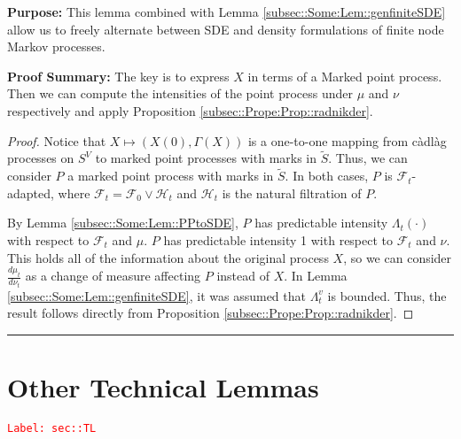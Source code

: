 \documentclass[12pt]{article}
\newcommand{\mc}{\mathcal}
\newcommand{\tr}{\textcolor{red}}
\newcommand{\labe}[1]{\tr{\texttt{Label: #1}}}
\newcommand{\purpose}{\textbf{Purpose: }}
\newcommand{\pfsum}{\textbf{Proof Summary: }}
\newcommand{\ind}{\hspace{24pt}}
\newcommand{\lin}{\rule{\linewidth}{0.4 pt}}
\renewcommand{\v}{v}							%
\renewcommand{\S}{S}							%
\renewcommand{\t}{t}							%
\newcommand{\F}{\mc{F}}							%
\newcommand{\FH}{\mc{H}}						%
\newcommand{\X}{X}								%
\newcommand{\vind}[1]{^{#1}}					%
\newcommand{\carp}[1]{^{#1}}					%
\newcommand{\tp}[1]{(#1)}						%
\newcommand{\ts}[1]{_{#1}}						%
\newcommand{\alt}[1]{\widetilde{#1}}			%
\newcommand{\m}{\mu}							%
\newcommand{\mm}{\nu}							%
\newcommand{\pmap}{\Gamma}						%
\newcommand{\rp}{P}								%
\newcommand{\ratee}{\Lambda}					%
\begin{document}
\purpose This lemma combined with Lemma \ref{subsec::Some:Lem::genfiniteSDE} allow us to freely alternate between SDE and density formulations of finite node Markov processes.

\pfsum The key is to express \(\X\) in terms of a Marked point process. Then we can compute the intensities of the point process under \(\m\) and \(\mm\) respectively and apply Proposition \ref{subsec::Prope:Prop::radnikder}.

\begin{proof}
Notice that \(\X \mapsto (\X\tp{0},\pmap(\X))\) is a one-to-one mapping from c\`adl\`ag processes on \(\S\carp{V}\) to marked point processes with marks in \(\alt{\S}\). Thus, we can consider \(\rp\) a marked point process with marks in \(\alt{\S}\). In both cases, \(\rp\) is \(\F\ts{\t}\)-adapted, where \(\F\ts{\t} = \F\ts{0}\vee \FH\ts{\t}\) and \(\FH\ts{\t}\) is the natural filtration of \(\rp\).

\ind By Lemma \ref{subsec::Some:Lem::PPtoSDE}, \(\rp\) has predictable intensity \(\ratee\ts{\t}(\cdot)\) with respect to \(\F\ts{\t}\) and \(\m\). \(\rp\) has predictable intensity 1 with respect to \(\F\ts{\t}\) and \(\mm\). This holds all of the information about the original process \(\X\), so we can consider \(\frac{d\m\ts{\t}}{d\mm\ts{\t}}\) as a change of measure affecting \(\rp\) instead of \(\X\). In Lemma \ref{subsec::Some:Lem::genfiniteSDE}, it was assumed that \(\ratee\ts{\t}\vind{\v}\) is bounded. Thus, the result follows directly from Proposition \ref{subsec::Prope:Prop::radnikder}. 
\end{proof}

\lin
\section{Other Technical Lemmas}
\label{sec::TL}\labe{sec::TL}
\end{document}
